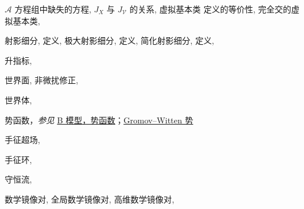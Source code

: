 \begin{theindex}
\subsubitem \leavevmode\hypertarget{idx:0984}{$\mathcal A$ 方程组中缺失的方程},\enspace{}
\subitem \leavevmode\hypertarget{idx:0985}{$J_X$ 与 $J_{\mathcal V}$ 的关系},\enspace{}
\subitem \leavevmode\hypertarget{idx:0986}{虚拟基本类}
\subsubitem \leavevmode\hypertarget{idx:0987}{定义的等价性},\enspace{}
\subsubitem \leavevmode\hypertarget{idx:0988}{完全交的虚拟基本类},\enspace{}
\indexspace
\item \leavevmode\hypertarget{idx:1094}{射影细分},\enspace{}
\subitem \leavevmode\hypertarget{idx:1095}{定义},\enspace{}
\subitem \leavevmode\hypertarget{idx:1096}{极大射影细分},\enspace{}
\subsubitem \leavevmode\hypertarget{idx:1097}{定义},\enspace{}
\subitem \leavevmode\hypertarget{idx:1098}{简化射影细分},\enspace{}
\subsubitem \leavevmode\hypertarget{idx:1099}{定义},\enspace{}
\indexspace
\item \leavevmode\hypertarget{idx:1204}{升指标},\enspace{}
\indexspace
\item \leavevmode\hypertarget{idx:1440}{世界面},\enspace{}
\subitem \leavevmode\hypertarget{idx:1441}{非微扰修正},\enspace{}
\indexspace
\item \leavevmode\hypertarget{idx:1442}{世界体},\enspace{}
\indexspace
\item \leavevmode\hypertarget{idx:1083}{势函数}，\textit{参见} \hyperlink{idx:0064}{B 模型，势函数}；\hyperlink{idx:0552}{Gromov--Witten 势}
\indexspace
\item \leavevmode\hypertarget{idx:0121}{手征超场},\enspace{}
\indexspace
\item \leavevmode\hypertarget{idx:0120}{手征环},\enspace{}
\indexspace
\item \leavevmode\hypertarget{idx:0175}{守恒流},\enspace{}
\indexspace
\item \leavevmode\hypertarget{idx:0748}{数学镜像对},\enspace{}
\subitem \leavevmode\hypertarget{idx:0749}{全局数学镜像对},\enspace{}
\subitem \leavevmode\hypertarget{idx:0750}{高维数学镜像对},\enspace{}

\end{theindex}
